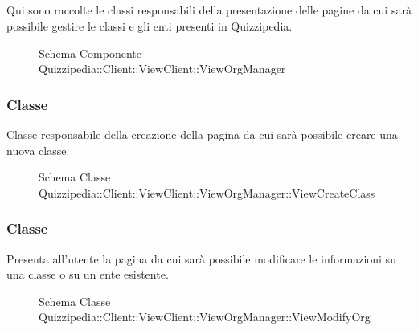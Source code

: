 \subsection{}
Qui sono raccolte le classi responsabili della presentazione delle pagine da cui sarà possibile gestire le classi e gli enti presenti in Quizzipedia.
\begin{figure}[H]
\centering
\noindent{}
\caption[Schema Componente Quizzipedia::Client::ViewClient::ViewOrgManager]{Schema Componente Quizzipedia::Client::ViewClient::ViewOrgManager}
\end{figure}
\subsubsection{Classe }
Classe responsabile della creazione della pagina da cui sarà possibile creare una nuova classe.
\begin{figure}[H]
\centering
\noindent{}
\caption[Schema Classe ViewCreateClass]{Schema Classe Quizzipedia::Client::ViewClient::ViewOrgManager::ViewCreateClass}
\end{figure}
\subsubsection{Classe }
Presenta all'utente la pagina da cui sarà possibile modificare le informazioni su una classe o su un ente esistente.
\begin{figure}[H]
\centering
\noindent{}
\caption[Schema Classe ViewModifyOrg]{Schema Classe Quizzipedia::Client::ViewClient::ViewOrgManager::ViewModifyOrg}
\end{figure}
